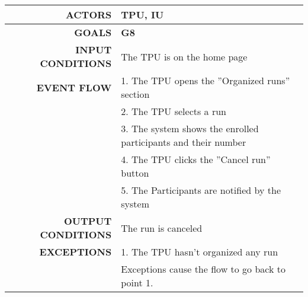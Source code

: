 \begin{table}[h!]
\begin{tabular}{|r|p{3in}|}
\hline
\textbf{ACTORS} & TPU, IU\\
\hline
\textbf{GOALS} & \textbf{G8}\\
\hline
\textbf{INPUT CONDITIONS} & The TPU is on the home page\\
\hline
\textbf{EVENT FLOW} 
&1. The TPU opens the ''Organized runs'' section \\
&2. The TPU selects a run \\
&3. The system shows the enrolled participants and their number\\
&4. The TPU clicks the ''Cancel run'' button \\
&5. The Participants are notified by the system \\
\hline
\textbf{OUTPUT CONDITIONS} & The run is canceled \\
\hline
\textbf{EXCEPTIONS} 
&1. The TPU hasn't organized any run\\
&Exceptions cause the flow to go back to point 1.\\
\hline
\end{tabular}
\end{table}